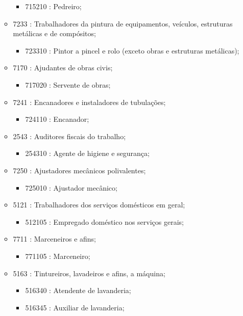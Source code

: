 \begin{itemize}
\begin{itemize}
    \begin{itemize}
      \item 715210 : Pedreiro;
    \end{itemize}
    \item 7233 : Trabalhadores da pintura de equipamentos, veículos, estruturas metálicas e de compósitos;
    \begin{itemize}
      \item 723310 : Pintor a pincel e rolo (exceto obras e estruturas metálicas);
    \end{itemize}
    \item 7170 : Ajudantes de obras civis;
    \begin{itemize}
      \item 717020 : Servente de obras;
    \end{itemize}
    \item 7241 : Encanadores e instaladores de tubulações;
    \begin{itemize}
      \item 724110 : Encanador;
    \end{itemize}
    \item 2543 : Auditores fiscais do trabalho;
    \begin{itemize}
      \item 254310 : Agente de higiene e segurança;
    \end{itemize}
    \item 7250 : Ajustadores mecânicos polivalentes;
    \begin{itemize}
      \item 725010 : Ajustador mecânico;
    \end{itemize}
    \item 5121 : Trabalhadores dos serviços domésticos em geral;
    \begin{itemize}
      \item 512105 : Empregado doméstico nos serviços gerais;
    \end{itemize}
    \item 7711 : Marceneiros e afins;
    \begin{itemize}
      \item 771105 : Marceneiro;
    \end{itemize}
    \item 5163 : Tintureiros, lavadeiros e afins, a máquina;
    \begin{itemize}
      \item 516340 : Atendente de lavanderia;
      \item 516345 : Auxiliar de lavanderia;

\end{itemize}
\end{itemize}
\end{itemize}
